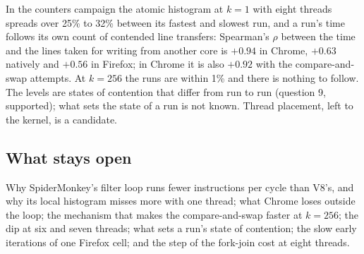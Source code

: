 In the counters campaign the atomic histogram at $k=1$ with eight threads
spreads over 25\% to 32\% between its fastest and slowest run, and a run's
time follows its own count of contended line transfers: Spearman's $\rho$
between the time and the lines taken for writing from another core is
$+0.94$ in Chrome, $+0.63$ natively and $+0.56$ in Firefox; in Chrome it is
also $+0.92$ with the compare-and-swap attempts. At $k=256$ the runs are
within 1\% and there is nothing to follow. The levels are states of
contention that differ from run to run (question 9, supported); what sets
the state of a run is not known. Thread placement, left to the kernel, is a
candidate.

\subsection{What stays open}

Why SpiderMonkey's filter loop runs fewer instructions per cycle than
V8's, and why its local histogram misses more with one thread; what Chrome
loses outside the loop; the mechanism that makes the compare-and-swap
faster at $k=256$; the dip at six and seven threads; what sets a run's
state of contention; the slow early iterations of one Firefox cell; and the
step of the fork-join cost at eight threads.
